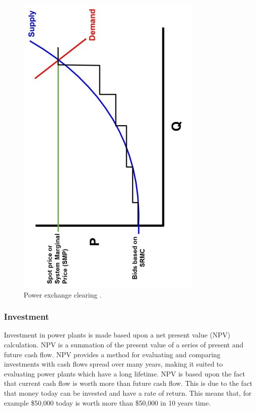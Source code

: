 \begin{figure}
	\centering
	\includegraphics[width=1\linewidth]{figures/power_market}
	\caption{Power exchange clearing \cite{nuclear_economics_consulting_group_2019}.}
	\label{fig:powermarket}
\end{figure}

\subsubsection{Investment}




Investment in power plants is made based upon a net present value (NPV) calculation. NPV is a summation of the present value of a series of present and future cash flow. NPV provides a method for evaluating and comparing investments with cash flows spread over many years, making it suited to evaluating power plants which have a long lifetime. NPV is based upon the fact that current cash flow is worth more than future cash flow. This is due to the fact that money today can be invested and have a rate of return. This means that, for example \$50,000 today is worth more than \$50,000 in 10 years time.

